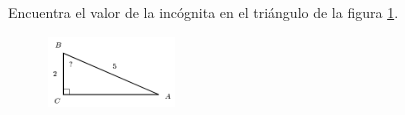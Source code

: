 \question[15]  Encuentra el valor de la incógnita en el triángulo de la figura \ref{fig:angle_functrig_11}.
\begin{figure}[H]
    \begin{center}
        \includegraphics[width=0.3\textwidth]{../images/angle_functrig_11.png}
    \end{center}
    \caption{}
    \label{fig:angle_functrig_11}
\end{figure}
